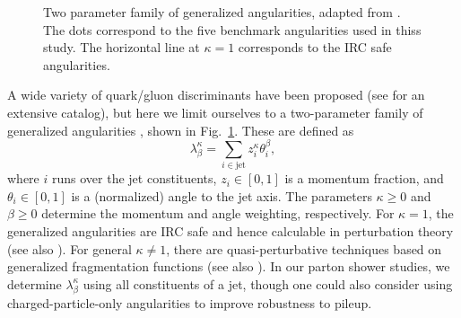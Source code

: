 \documentclass[11pt]{cernrep}
\begin{document}
\begin{figure}
\centering
{}
\caption{Two parameter family of generalized angularities, adapted from \cite{Larkoski:2014pca}.  The dots correspond to the five benchmark angularities used in thiss study.  The horizontal line at $\kappa = 1$ corresponds to the IRC safe angularities.}
\label{quarkgluon_fig:lambda_space}
\end{figure}

A wide variety of quark/gluon discriminants have been proposed (see \cite{Gallicchio:2012ez} for an extensive catalog), but here we limit ourselves to a two-parameter family of generalized angularities \cite{Larkoski:2014pca}, shown in Fig.~\ref{quarkgluon_fig:lambda_space}.  These are defined as
\begin{equation}
\label{quarkgluon_eq:genang}
\lambda^{\kappa}_{\beta} = \sum_{i \in \text{jet}} z_i^\kappa \theta_i^\beta,
\end{equation}
where $i$ runs over the jet constituents, $z_i \in [0,1]$ is a momentum fraction, and $\theta_i \in [0,1]$ is a (normalized) angle to the jet axis.  The parameters $\kappa \ge 0$ and $\beta \ge 0$ determine the momentum and angle weighting, respectively.  For $\kappa = 1$, the generalized angularities are IRC safe and hence calculable in perturbation theory \cite{Larkoski:2014uqa} (see also \cite{Ellis:2010rwa,Larkoski:2013paa,Larkoski:2014tva,Procura:2014cba,Hornig:2016ahz}).  For general $\kappa \not= 1$, there are quasi-perturbative techniques based on generalized fragmentation functions \cite{Larkoski:2014pca} (see also \cite{Krohn:2012fg,Waalewijn:2012sv,Chang:2013rca,Chang:2013iba}).  In our parton shower studies, we determine $\lambda^{\kappa}_{\beta}$ using all constituents of a jet, though one could also consider using charged-particle-only angularities to improve robustness to pileup.
\end{document}
